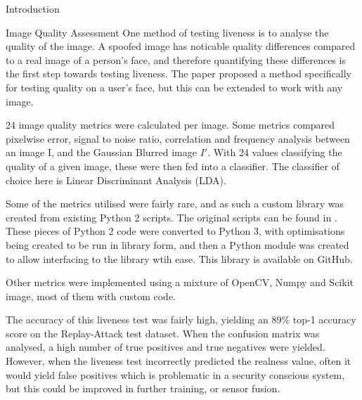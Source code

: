 \documentclass[final]{beamer}
\begin{document}
\begin{frame}{}
\begin{columns}[t]
\begin{column}{.48\linewidth}
\begin{block}{Introduction}
        \end{block}

        \begin{block}{Image Quality Assessment}
          One method of testing liveness is to analyse the quality of the image. A spoofed image has noticable quality differences compared to a real image of a person's face,
          and therefore quantifying these differences is the first step towards testing liveness. The paper \cite{ImageQualityAssessment} proposed a method specifically for testing
          quality on a user's face, but this can be extended to work with any image.

          24 image quality metrics were calculated per image. Some metrics compared pixelwise error, signal to noise ratio, correlation and frequency analysis between an image I,
          and the Gaussian Blurred image $I'$. With 24 values classifying the quality of a given image, these were then fed into a classifier. The classifier of choice here is
          Linear Discriminant Analysis (LDA).

          Some of the metrics utilised were fairly rare, and as such a custom library was created from existing Python 2 scripts. The original
          scripts can be found in \cite{OriginalPython2ScriptsLib}. These pieces of Python 2 code were converted to Python 3,
          with optimisations being created to be run in library form, and then a Python module was created to allow interfacing to the library wtih ease. This library is available
          on GitHub. \cite{OurLibrary}

          Other metrics were implemented using a mixture of OpenCV, Numpy and Scikit image, most of them with custom code.
          
          The accuracy of this liveness test was fairly high, yielding an 89\% top-1 accuracy score on the Replay-Attack test dataset. When the confusion matrix was analysed,
          a high number of true positives and true negatives were yielded. However, when the liveness test incorrectly predicted the realness value, often it would yield false positives
          which is problematic in a security conscious system, but this could be improved in further training, or sensor fusion.

        \end{block}
       

\end{column}
\end{columns}
\end{frame}
\end{document}
